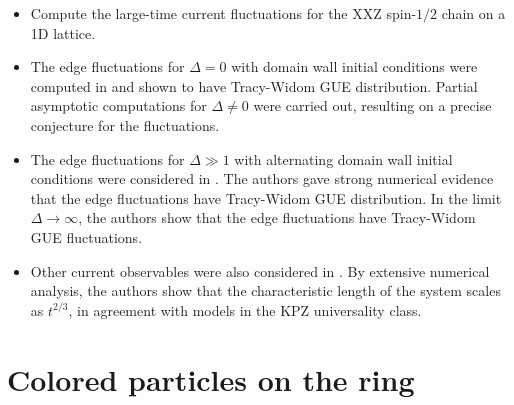 \documentclass{article}
\theoremstyle{definition}
\begin{document}
\begin{itemize}
    \item Compute the large-time current fluctuations for the XXZ spin-$1/2$ chain on a 1D lattice.
    \item The edge fluctuations for $\Delta=0$ with domain wall initial conditions were computed in \cite{SaenzTracyWidom2022} and shown to have Tracy-Widom GUE distribution. Partial asymptotic computations for $\Delta\neq 0$ were carried out, resulting on a precise conjecture for the fluctuations.
    \item The edge fluctuations for $\Delta \gg 1$ with alternating domain wall initial conditions were considered in \cite{fujimotoSasamoto2024quantum}. The authors gave strong numerical evidence that the edge fluctuations have Tracy-Widom GUE distribution. In the limit $\Delta \rightarrow \infty$, the authors show that the edge fluctuations have Tracy-Widom GUE fluctuations.
		\item Other current observables were also considered in \cite{takeuchi2024partial}. By extensive numerical analysis, the authors show that the characteristic length of the system scales as $t^{2/3}$, in agreement with models in the KPZ universality class.
\end{itemize}

\section{Colored particles on the ring}
\end{document}
